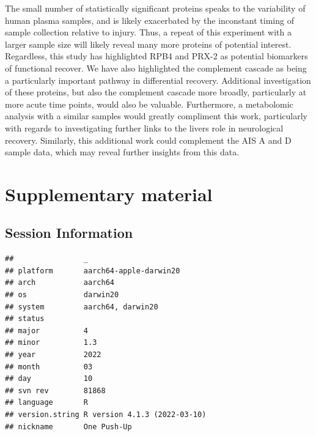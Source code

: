 \documentclass[9pt,lineno]{elife}
\newcommand{\beginsupplement}{\setcounter{table}{0}  \renewcommand{\thetable}{S\arabic{table}} \setcounter{figure}{0} \renewcommand{\thefigure}{S\arabic{figure}}}
\begin{document}
\begin{landscape}
\begin{landscape}
The small number of statistically significant proteins speaks to the variability of human plasma samples, and is likely exacerbated by the inconstant timing of sample collection relative to injury.
Thus, a repeat of this experiment with a larger sample size will likely reveal many more proteins of potential interest.
Regardless, this study has highlighted RPB4 and PRX-2 as potential biomarkers of functional recover.
We have also highlighted the complement cascade as being a particularly important pathway in differential recovery.
Additional investigation of these proteins, but also the complement cascade more broadly, particularly at more acute time points, would also be valuable.
Furthermore, a metabolomic analysis with a similar samples would greatly compliment this work, particularly with regards to investigating further links to the livers role in neurological recovery.
Similarly, this additional work could complement the AIS A and D sample data, which may reveal further insights from this data.

\newpage

\hypertarget{sup-data}{%
\section*{Supplementary material}\label{sup-data}}

\beginsupplement

\hypertarget{session-information}{%
\subsection{Session Information}\label{session-information}}

\begin{verbatim}
##                _                           
## platform       aarch64-apple-darwin20      
## arch           aarch64                     
## os             darwin20                    
## system         aarch64, darwin20           
## status                                     
## major          4                           
## minor          1.3                         
## year           2022                        
## month          03                          
## day            10                          
## svn rev        81868                       
## language       R                           
## version.string R version 4.1.3 (2022-03-10)
## nickname       One Push-Up
\end{verbatim}


\end{landscape}
\end{landscape}
\end{document}
